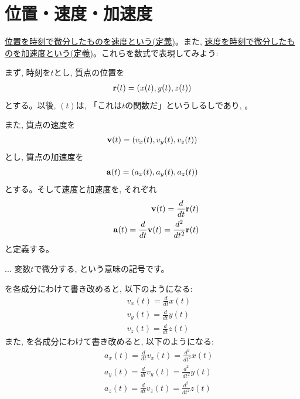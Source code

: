 \section{位置・速度・加速度}

\underline{位置を時刻で微分したものを速度という(定義)}。また, 
\underline{速度を時刻で微分したものを加速度という(定義)}。これらを数式で表現してみよう:

まず, 時刻を$t$とし, 質点の位置を
\begin{eqnarray}
{\bf r}(t)=(x(t), y(t), z(t))
\end{eqnarray}
とする。以後, $(t)$は, 「これは$t$の関数だ」というしるしであり, 。

また, 質点の速度を
\begin{eqnarray}
{\bf v}(t)=(v_x(t), v_y(t), v_z(t))
\end{eqnarray}
とし, 質点の加速度を
\begin{eqnarray}
{\bf a}(t)=(a_x(t), a_y(t), a_z(t))
\end{eqnarray}
とする。そして速度と加速度を, それぞれ
\begin{eqnarray}
&&{\bf v}(t)=\frac{d}{dt}{\bf r}(t)\label{eq:v_drdt}\\
&&{\bf a}(t)=\frac{d}{dt}{\bf v}(t)=\frac{d^2}{dt^2}{\bf r}(t)\label{eq:a_dvdt}
\end{eqnarray}
と定義する。

\begin{faq}{\small{}
 ... 変数$t$で微分する, という意味の記号です。}\end{faq}

を各成分にわけて書き改めると, 以下のようになる:
\begin{eqnarray}
&&v_x(t)=\frac{d}{dt}x(t)\label{eq:def_vx_dxdt}\\
&&v_y(t)=\frac{d}{dt}y(t)\label{eq:def_vy_dydt}\\
&&v_z(t)=\frac{d}{dt}z(t)\label{eq:def_vz_dzdt}
\end{eqnarray}
また, を各成分にわけて書き改めると, 以下のようになる:
\begin{eqnarray}
&&a_x(t)=\frac{d}{dt}v_x(t)=\frac{d^2}{dt^2}x(t)\label{eq:def_ax_dvdt}\\
&&a_y(t)=\frac{d}{dt}v_y(t)=\frac{d^2}{dt^2}y(t)\\
&&a_z(t)=\frac{d}{dt}v_z(t)=\frac{d^2}{dt^2}z(t)
\end{eqnarray}

